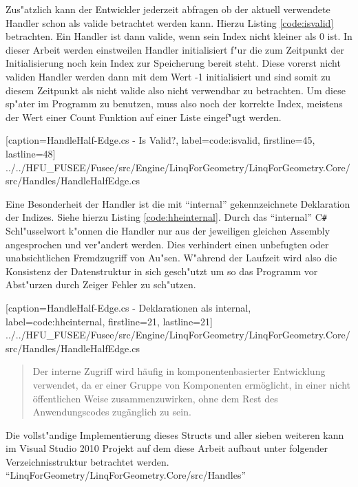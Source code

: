 \documentclass[pagesize, paper=a4, fontsize=12pt,titlepage=true, headings=small, headnosepline, abstractoff, liststotoc, nochapterprefix, plainheadsepline]{scrreprt}
\newcommand{\CSS}{C\texttt{\# }}
\begin{document}
Zus"atzlich kann der Entwickler jederzeit abfragen ob der aktuell verwendete Handler schon als valide betrachtet werden kann. Hierzu Listing \ref{code:isvalid} betrachten. Ein Handler ist dann valide, wenn sein Index nicht kleiner als 0 ist. In dieser Arbeit werden einstweilen Handler initialisiert f"ur die zum Zeitpunkt der Initialisierung noch kein Index zur Speicherung bereit steht. Diese vorerst nicht validen Handler werden dann mit dem Wert -1 initialisiert und sind somit zu diesem Zeitpunkt als nicht valide also nicht verwendbar zu betrachten. Um diese sp"ater im Programm zu benutzen, muss also noch der korrekte Index, meistens der Wert einer Count Funktion auf einer Liste eingef"ugt werden.

			[caption={HandleHalf-Edge.cs - Is Valid?}, label=code:isvalid, firstline=45, lastline=48]
			{../../HFU_FUSEE/Fusee/src/Engine/LinqForGeometry/LinqForGeometry.Core/src/Handles/HandleHalfEdge.cs}

Eine Besonderheit der Handler ist die mit "`internal"' gekennzeichnete Deklaration der Indizes. Siehe hierzu Listing \ref{code:hheinternal}. Durch das "`internal"' \CSS Schl"usselwort k"onnen die Handler nur aus der jeweiligen gleichen Assembly angesprochen und ver"andert werden. Dies verhindert einen unbefugten oder unabsichtlichen Fremdzugriff von Au"sen. W"ahrend der Laufzeit wird also die Konsistenz der Datenstruktur in sich gesch"utzt um so das Programm vor Abst"urzen durch Zeiger Fehler zu sch"utzen.

			[caption={HandleHalf-Edge.cs - Deklarationen als internal}, label=code:hheinternal, firstline=21, lastline=21]
			{../../HFU_FUSEE/Fusee/src/Engine/LinqForGeometry/LinqForGeometry.Core/src/Handles/HandleHalfEdge.cs}

\begin{quote}{\dq}Der interne Zugriff wird h{\"a}ufig in komponentenbasierter Entwicklung verwendet, da er einer Gruppe von Komponenten erm{\"o}glicht, in einer nicht {\"o}ffentlichen Weise zusammenzuwirken, ohne dem Rest des Anwendungscodes zug{\"a}nglich zu sein.{\dq} \cite{MicrosoftCReferenz.2013}\end{quote}


Die vollst"andige Implementierung dieses Structs und aller sieben weiteren kann im Visual Studio 2010 Projekt auf dem diese Arbeit aufbaut unter folgender Verzeichnisstruktur betrachtet werden. "`LinqForGeometry/LinqForGeometry.Core/src/Handles"'
\end{document}
